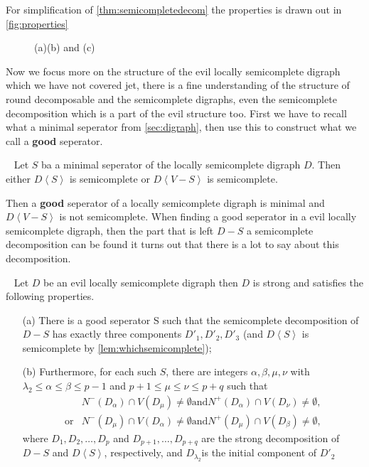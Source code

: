 For simplification of \autoref{thm:semicompletedecom} the properties is drawn out in \autoref{fig:properties}
\begin{figure}
    \caption{(a)(b) and (c)}
    \label{fig:properties}
\end{figure}
Now we focus more on the structure of the evil locally semicomplete digraph which we have not covered jet, there is a fine understanding of the structure of round decomposable and the semicomplete digraphs, even the semicomplete decomposition which is a part of the evil structure too.
First we have to recall what a minimal seperator from \autoref{sec:digraph}, then use this to construct what we call a \textbf{good} seperator.
\begin{lemma}~\cite{bangJGT85}
    Let $S$ ba a minimal seperator of the locally semicomplete digraph $D$. Then either $D\left< S\right>$ is semicomplete or $D\left< V-S\right>$ is semicomplete.
    \label{lem:whichsemicomplete}
\end{lemma}
Then a \textbf{good} seperator of a locally semicomplete digraph is minimal and $D\left<V-S\right>$ is not semicomplete.
When finding a good seperator in a evil locally semicomplete digraph, then the part that is left $D-S$ a semicomplete decomposition can be found it turns out that there is a lot to say about this decomposition.
\begin{thm}~\cite{bangJGT85,bangJCT102}
    Let $D$ be an evil locally semicomplete digraph then $D$ is strong and satisfies the following properties.
    \begin{itemize}
        \item[(a)]There is a good seperator S such that the semicomplete decomposition of $D-S$ has exactly three components $D'_1,D'_2,D'_3$ (and $D\left<S\right>$ is semicomplete by \autoref{lem:whichsemicomplete});
        \item[(b)] Furthermore, for each such $S$, there are integers $\alpha, \beta,\mu,\nu$ with $\lambda_2\leq \alpha \leq \beta \leq p-1$ and $p+1\leq \mu \leq \nu \leq p+q$ such that 
        \begin{align}
            &N^-(D_\alpha)\cap V(D_\mu)\neq \emptyset \text{and} N^+(D_\alpha)\cap V(D_\nu)\neq \emptyset,\\
            \text{or} &N^-(D_\mu)\cap V(D_\alpha)\neq \emptyset \text{and} N^+(D_\mu)\cap V(D_\beta)\neq \emptyset,
        \end{align} 
        where $D_1,D_2,\dots, D_p$ and $D_{p+1},\dots,D_{p+q}$ are the strong decomposition of $D-S$ and $D\left< S\right>$, respectively, and $D_{\lambda_2}$is the initial component of $D'_2$ 
    \end{itemize}
    \label{thm:evildecom}
\end{thm}
